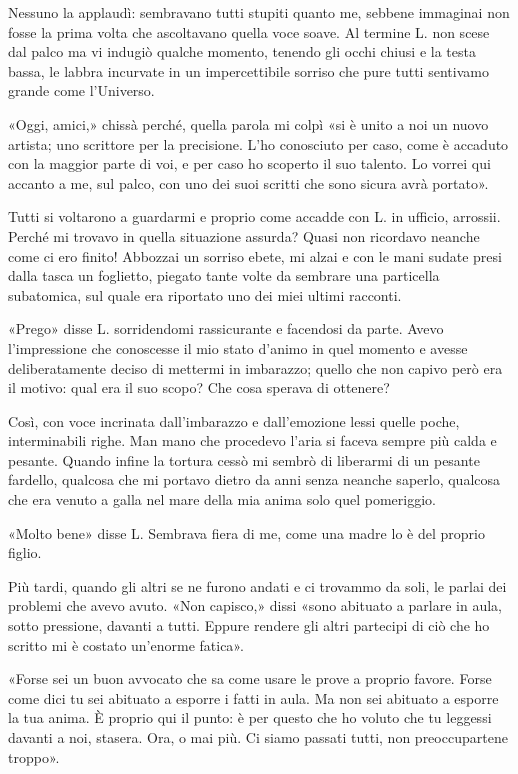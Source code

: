 \documentclass[a4paper,12pt]{book}
\begin{document}
Nessuno la applaudì: sembravano tutti stupiti quanto me, sebbene immaginai
non fosse la prima volta che ascoltavano quella voce soave. Al termine L. non
scese dal palco ma vi indugiò qualche momento, tenendo gli occhi chiusi e la
testa bassa, le labbra incurvate in un impercettibile sorriso che pure tutti
sentivamo grande come l'Universo.

«Oggi, amici,» chissà perché, quella parola mi colpì «si è unito a noi un
nuovo artista; uno scrittore per la precisione. L'ho conosciuto per caso,
come è accaduto con la maggior parte di voi, e per caso ho scoperto il suo
talento. Lo vorrei qui accanto a me, sul palco, con uno dei suoi scritti che
sono sicura avrà portato».

Tutti si voltarono a guardarmi e proprio come accadde con L. in ufficio,
arrossii. Perché mi trovavo in quella situazione assurda? Quasi non ricordavo
neanche come ci ero finito! Abbozzai un sorriso ebete, mi alzai e con le mani
sudate presi dalla tasca un foglietto, piegato tante volte da sembrare una
particella subatomica, sul quale era riportato uno dei miei ultimi racconti.

«Prego» disse L. sorridendomi rassicurante e facendosi da parte. Avevo
l'impressione che conoscesse il mio stato d'animo in quel momento e avesse
deliberatamente deciso di mettermi in imbarazzo; quello che non capivo però
era il motivo: qual era il suo scopo? Che cosa sperava di ottenere?

Così, con voce incrinata dall'imbarazzo e dall'emozione lessi quelle
poche, interminabili righe. Man mano che procedevo l'aria si faceva sempre
più calda e pesante. Quando infine la tortura cessò mi sembrò di liberarmi
di un pesante fardello, qualcosa che mi portavo dietro da anni senza neanche
saperlo, qualcosa che era venuto a galla nel mare della mia anima solo quel
pomeriggio.

«Molto bene» disse L. Sembrava fiera di me, come una madre lo è del proprio
figlio.

Più tardi, quando gli altri se ne furono andati e ci trovammo da soli, le
parlai dei problemi che avevo avuto. «Non capisco,» dissi «sono abituato a
parlare in aula, sotto pressione, davanti a tutti. Eppure rendere gli altri
partecipi di ciò che ho scritto mi è costato un'enorme fatica».

«Forse sei un buon avvocato che sa come usare le prove a proprio favore. Forse
come dici tu sei abituato a esporre i fatti in aula. Ma non sei abituato a
esporre la tua anima. È proprio qui il punto: è per questo che ho voluto che tu
leggessi davanti a noi, stasera. Ora, o mai più. Ci siamo passati tutti, non
preoccupartene troppo».
\end{document}
